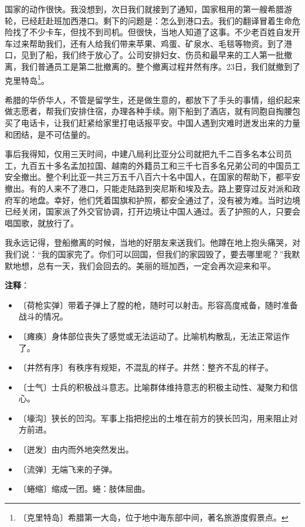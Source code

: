 \documentclass[12pt,UTF-8,openany]{ctexbook}
\begin{document}
\begin{Large}
    国家的动作很快。我没想到，次日我们就接到了通知，国家租用的第一艘希腊游轮，已经赶赴班加西港口。剩下的问题是：怎么到港口去。我们的翻译冒着生命危险找了不少卡车，但找不到司机。但很快，当地人知道了这事。不少老百姓自发开车过来帮助我们，还有人给我们带来苹果、鸡蛋、矿泉水、毛毯等物资。到了港口，见到了船，我们终于放心了。公司安排妇女、伤员和最早来的工人第一批撤离，我们普通员工是第二批撤离的。整个撤离过程井然有序。23日，我们就撤到了克里特岛\footnote{〔克里特岛〕希腊第一大岛，位于地中海东部中间，著名旅游度假景点。}。
    
    希腊的华侨华人，不管是留学生，还是做生意的，都放下了手头的事情，组织起来做志愿者，帮我们安排住宿，办理各种手续。刚下船到了酒店，就有同胞自掏腰包买了电话卡，让我们赶紧给家里打电话报平安。中国人遇到灾难时迸发出来的力量和团结，是不可估量的。
    
    事后我得知，仅用三天时间，中建八局利比亚分公司就把九千二百多名本公司员工，九百五十多名孟加拉国、越南的外籍员工和三千七百多名兄弟公司的中国员工安全撤出。整个利比亚一共三万五千八百六十名中国人，在国家的帮助下，都平安撤出。有的人来不了港口，只能走陆路到突尼斯和埃及去。路上要穿过反对派和政府军的地盘。幸好，他们凭着国旗和护照，都安全通过了，没有被为难。当时边境已经关闭，国家派了外交官协调，打开边境让中国人通过。丢了护照的人，只要会唱国歌，就放行了。
    
    我永远记得，登船撤离的时候，当地的好朋友来送我们。他蹲在地上抱头痛哭，对我们说：“我的国家完了。你们可以回国，但我们的家园毁了，要去哪里呢？”我默默地想，总有一天，我们会回去的。美丽的班加西，一定会再次迎来和平。
    
\end{Large}


\newpage

\textbf{注释}：

\vspace{-1em}

\begin{itemize}
    \setlength\itemsep{-0.2em}
    \item 〔荷枪实弹〕带着子弹上了膛的枪，随时可以射击。形容高度戒备，随时准备战斗的情况。
    \item 〔瘫痪〕身体部位丧失了感觉或无法运动了。比喻机构散乱，无法正常运作了。
    \item 〔井然有序〕有秩序有规矩，不混乱的样子。井然：整齐不乱的样子。
    \item 〔士气〕士兵的积极战斗意志。比喻群体维持意志的积极主动性、凝聚力和信心。
    \item 〔壕沟〕狭长的凹沟。军事上指把挖出的土堆在前方的狭长凹沟，用来阻止对方前进。
    \item 〔迸发〕由内而外地突然发出。
    \item 〔流弹〕无端飞来的子弹。
    \item 〔蜷缩〕缩成一团。蜷：肢体屈曲。
\end{itemize}
\end{document}
